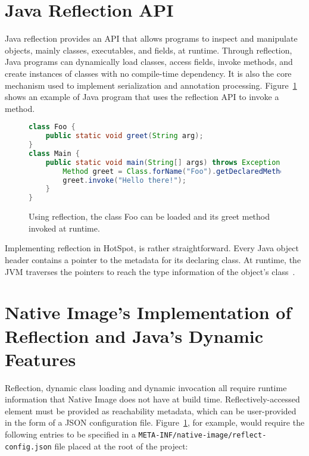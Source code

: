 \section{Java Reflection API}
Java reflection provides an API that allows programs to inspect and manipulate objects, mainly classes, executables, and fields, at runtime.
Through reflection, Java programs can dynamically load classes, access fields, invoke methods, and create instances of classes with no compile-time dependency. It is also the core mechanism used to implement serialization and annotation processing. Figure~\ref{fig:reflective_calls} shows an example of Java program that uses the reflection API to invoke a method.

\begin{figure}[ht]
    \centering
\begin{lstlisting}[language=Java]
class Foo {
    public static void greet(String arg);
}
class Main {
    public static void main(String[] args) throws Exception {
        Method greet = Class.forName("Foo").getDeclaredMethod("greet");
        greet.invoke("Hello there!");
    }  
}
\end{lstlisting}
    \caption{Using reflection, the class Foo can be loaded and its greet method invoked at runtime.}
    \label{fig:reflective_calls}
\end{figure}

Implementing reflection in HotSpot, is rather straightforward. Every Java object header contains a pointer to the metadata for its declaring class. At runtime, the JVM traverses the pointers to reach the type information of the object's class~\cite{evans_ben_reflection_nodate}.



\section{Native Image's Implementation of Reflection and Java's Dynamic Features}
Reflection, dynamic class loading and dynamic invocation all require runtime information that Native Image does not have at build time.
Reflectively-accessed element must be provided as reachability metadata, which can be user-provided in the form of a JSON configuration file.  
Figure~\ref{fig:reflective_calls}, for example, would require the following entries to be specified in a \verb|META-INF/native-image/reflect-config.json| file placed at the root of the project:

